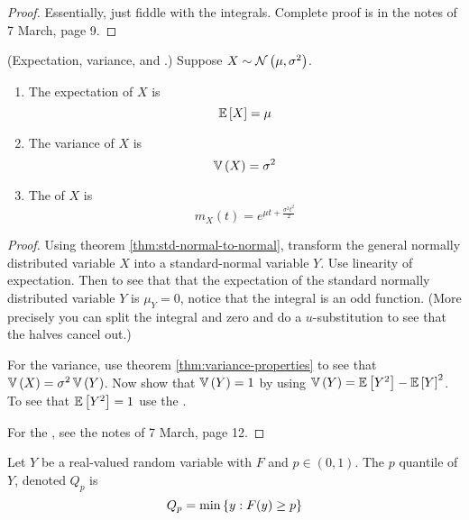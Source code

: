 \documentclass[11pt]{article}
\begin{document}
\begin{proof}
    Essentially, just fiddle with the integrals.
    Complete proof is in the notes of 7 March, page 9.
\end{proof}

\begin{thm}{(Expectation, variance, and \mgf{}.)}
    Suppose $X \sim \operatorname{\mathcal{N}}\left(\mu,\sigma^2\right)$.
    \begin{enumerate}
        \item
            The expectation of $X$ is
            \begin{equation*}
                \operatorname{\mathbb{E}}{\left[X\right]} = \mu
            \end{equation*}

        \item
            The variance of $X$ is
            \begin{equation*}
                \operatorname{\mathbb{V}}{\left(X\right)} = \sigma^2
            \end{equation*}

        \item
            The \mgf{} of $X$ is
            \begin{equation*}
                m_X(t) = e^{\mu t + \frac{\sigma^2 t^2}{2}}
            \end{equation*}
    \end{enumerate}
\end{thm}

\begin{proof}
    Using theorem \ref{thm:std-normal-to-normal}, transform the general
    normally distributed variable $X$ into a standard-normal variable $Y$. Use
    linearity of expectation.
    Then to see that that the expectation of the standard normally distributed
    variable $Y$ is $\mu_Y = 0$, notice that the integral is an odd function.
    (More precisely you can split the integral and zero and do a
    $u$-substitution to see that the halves cancel out.)

    For the variance, use theorem \ref{thm:variance-properties} to see that
    $\operatorname{\mathbb{V}}{\left(X\right)} = \sigma^2 \operatorname{\mathbb{V}}{\left(Y\right)}$. Now show that $\operatorname{\mathbb{V}}{\left(Y\right)} = 1$ by using
    $\operatorname{\mathbb{V}}{\left(Y\right)} = \operatorname{\mathbb{E}}{\left[Y^2\right]} - \operatorname{\mathbb{E}}{\left[Y\right]}^2$. To see that $\operatorname{\mathbb{E}}{\left[Y^2\right]} = 1$ use the \mgf{}.

    For the \mgf{}, see the notes of 7 March, page 12.
\end{proof}

\begin{defn}
    \label{def:quantile}
    Let $Y$ be a real-valued random variable with \cdf{} $F$
    and $p \in (0, 1)$.
    The $p$\th{} quantile of $Y$, denoted $Q_p$ is
    \begin{equation}
        \label{eq:quantile}
        Q_p = \min \left\{ y : F(y) \geq p \right\}
    \end{equation}
\end{defn}
\end{document}

